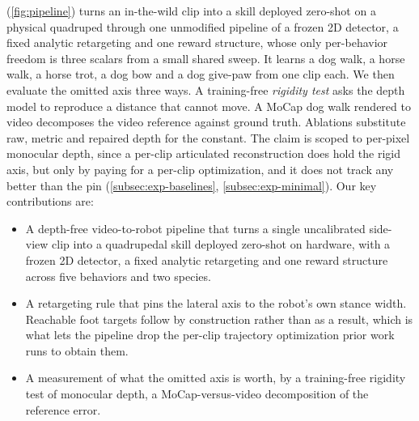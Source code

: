 \documentclass[letterpaper, 10 pt, conference]{ieeeconf}
\begin{document}
\ourMethod (\autoref{fig:pipeline}) turns an in-the-wild clip into a skill deployed zero-shot on a physical quadruped through one unmodified pipeline of a frozen 2D detector, a fixed analytic retargeting and one reward structure, whose only per-behavior freedom is three scalars from a small shared sweep. It learns a dog walk, a horse walk, a horse trot, a dog bow and a dog give-paw from one clip each.
We then evaluate the omitted axis three ways. A training-free \textit{rigidity test} asks the depth model to reproduce a distance that cannot move. A MoCap dog walk rendered to video decomposes the video reference against ground truth. Ablations substitute raw, metric and repaired depth for the constant. The claim is scoped to per-pixel monocular depth, since a per-clip articulated reconstruction does hold the rigid axis, but only by paying for a per-clip optimization, and it does not track any better than the pin (\autoref{subsec:exp-baselines}, \autoref{subsec:exp-minimal}).
Our key contributions are:
\begin{itemize}
\item A depth-free video-to-robot pipeline that turns a single uncalibrated side-view clip into a quadrupedal skill deployed zero-shot on hardware, with a frozen 2D detector, a fixed analytic retargeting and one reward structure across five behaviors and two species.
\item A retargeting rule that pins the lateral axis to the robot's own stance width. Reachable foot targets follow by construction rather than as a result, which is what lets the pipeline drop the per-clip trajectory optimization prior work runs to obtain them.
\item A measurement of what the omitted axis is worth, by a training-free rigidity test of monocular depth, a MoCap-versus-video decomposition of the reference error.
\end{itemize}
\end{document}
